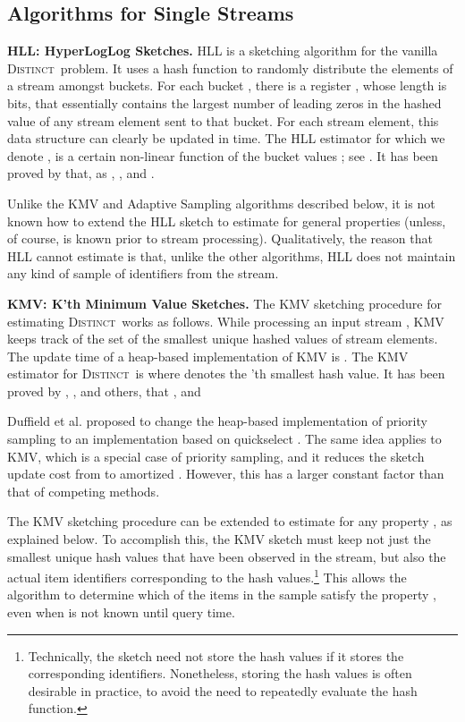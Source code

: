 \documentclass{article}
\newcommand{\distinct}{\textsc{Distinct}}
\newcommand{\distinctA}{\textsc{Distinct}}
\begin{document}
\subsection{Algorithms for Single Streams}
\noindent \textbf{HLL: HyperLogLog Sketches.}\label{subsubHLL}
HLL is a sketching algorithm for the vanilla \distinct\ problem. It uses a hash function to randomly distribute the elements of a stream  amongst  buckets.
For each bucket , there is a register , whose length is  bits, that essentially
contains the largest number of leading zeros in the hashed value of any stream element sent to that bucket.
For each stream element, this data structure can clearly be updated in  time.
The HLL estimator for  which we denote , is a certain non-linear function of the  bucket values ; 
see \cite{flajolet2008hyperloglog}. It has been proved by \cite{flajolet2008hyperloglog} that, as ,
, and . 

Unlike the KMV and Adaptive Sampling algorithms described below, it is not known how to extend the HLL sketch to estimate  for general properties  (unless, of course,  is known prior to stream
processing). 
Qualitatively, the reason that HLL cannot estimate 
is that, unlike the other algorithms, HLL does not maintain any kind of sample of identifiers from the stream.

\medskip
\noindent \textbf{KMV: K'th Minimum Value Sketches.}\label{subsubBKMV}
\label{sec:KMV}
The KMV sketching procedure for estimating \distinctA\ works as follows. While processing an input stream , KMV keeps track of the set  of the  smallest unique hashed values of stream elements.
The update time of a heap-based implementation of KMV is .
The KMV estimator for \distinctA\ is
 where  denotes the 'th smallest hash value.
It has been proved by \cite{beyer2009distinct}, \cite{giroire2009order}, and others, that , and


Duffield et al. \cite{DuffieldLT07} proposed to change 
the heap-based implementation of priority sampling
to an implementation based on quickselect \cite{quickselect61}. 
The same idea applies to KMV, which is a special case of priority sampling,
and it reduces the sketch update cost from  to amortized . 
However, this  has a larger constant factor than
that of competing methods.

The KMV sketching procedure can be extended to estimate  for any property , as explained below.
To accomplish this, the KMV sketch must keep not just the  smallest unique hash values that have been observed in the stream, but also 
the actual item identifiers corresponding to the hash values.\footnote{Technically, the sketch need not store the hash values if it stores the corresponding identifiers. 
Nonetheless, storing the hash values is often desirable in practice, to avoid the need to repeatedly evaluate the hash function.}
This allows the algorithm to determine which of the items in the sample
satisfy the property , even when  is not known until query time.
\end{document}
